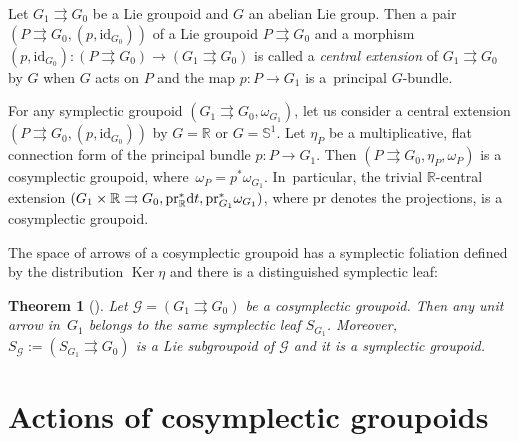 \documentclass[pdftex]{sigma}
\numberwithin{equation}{section}
\newtheorem{Theorem}{Theorem}[section]
\begin{document}
\begin{Example}
 Let $G_1\rightrightarrows G_0$ be a Lie groupoid and $G$ an abelian Lie group. Then a pair $({P\rightrightarrows G_0},\allowbreak (p,\textrm{id}_{G_0}))$ of a Lie groupoid $P\rightrightarrows G_0$ and a morphism $(p,\textrm{id}_{G_0})\colon (P\rightrightarrows G_0)\!\to\!{(G_1\rightrightarrows G_0)}$ is called a \textit{central extension} of $G_1\rightrightarrows G_0$ by $G$ when $G$ acts on $P$ and the map $p\colon P\to G_1$ is a~principal $G$-bundle.

 For any symplectic groupoid $(G_1\rightrightarrows G_0, \omega_{G_1})$, let us consider a central extension $({P\rightrightarrows G_0},\allowbreak (p,\textrm{id}_{G_0}))$ by $G=\mathbb{R}$ or $G=\mathbb{S}^1$. Let $\eta_P$ be a multiplicative, flat connection form of the principal bundle $p\colon P\to G_1$. Then $(P\rightrightarrows G_0,\eta_P,\omega_P)$ is a cosymplectic groupoid, where~${\omega_P=p^\ast\omega_{G_1}}$. In~particular, the trivial $\mathbb{R}$-central extension $(G_1\times\mathbb{R}\rightrightarrows G_0,\textrm{pr}_\mathbb{R}^\ast {\rm d}t,\textrm{pr}_{G_1}^\ast\omega_{G_1})$, where $\textrm{pr}$ denotes the projections, is a cosymplectic groupoid.
\end{Example}

The space of arrows of a cosymplectic groupoid has a symplectic foliation defined by the distribution $\operatorname{Ker}\eta$ and there is a distinguished symplectic leaf:
\begin{Theorem}[\cite{fernandes2023cosymplectic}]\label{thm:1}
 Let $\mathcal{G}=(G_1\rightrightarrows G_0)$ be a cosymplectic groupoid. Then any unit arrow in~$G_1$ belongs to the same symplectic leaf $S_{G_1}$. Moreover, $S_\mathcal{G}:=(S_{G_1}\rightrightarrows G_0)$ is a Lie subgroupoid of $\mathcal{G}$ and it is a symplectic groupoid.
\end{Theorem}

\section{Actions of cosymplectic groupoids}\label{action}
\end{document}
